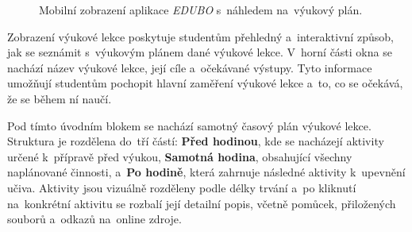 \documentclass[male,czech,api_bc]{kitheses}
\begin{document}
\begin{figure}[H]
	\centering
	\caption{Mobilní zobrazení aplikace \textit{EDUBO} s~náhledem na~výukový plán.}
	\label{fig:edubo-7}
\end{figure}

Zobrazení výukové lekce poskytuje studentům přehledný a~interaktivní způsob, jak se seznámit s~výukovým plánem dané výukové lekce. V~horní části okna se nachází název výukové lekce, její cíle a~očekávané výstupy. Tyto informace umožňují studentům pochopit hlavní zaměření výukové lekce a~to, co se očekává, že se během ní naučí.

Pod tímto úvodním blokem se nachází samotný časový plán výukové lekce. Struktura je rozdělena do~tří částí: \textbf{Před hodinou}, kde se nacházejí aktivity určené k~přípravě před výukou, \textbf{Samotná hodina}, obsahující všechny naplánované činnosti, a~\textbf{Po hodině}, která zahrnuje následné aktivity k~upevnění učiva. Aktivity jsou vizuálně rozděleny podle délky trvání a~po kliknutí na~konkrétní aktivitu se rozbalí její detailní popis, včetně pomůcek, přiložených souborů a~odkazů na~online zdroje.
\end{document}
